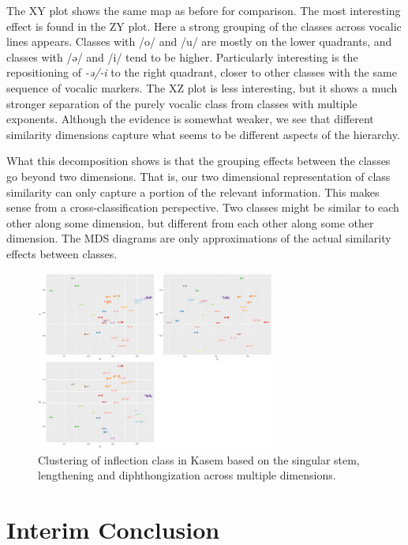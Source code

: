 The XY plot shows the same map as before for comparison. The most interesting effect is found in the ZY plot. Here a strong grouping of the classes across vocalic lines appears. Classes with /o/ and /u/ are mostly on the lower quadrants, and classes with /ə/ and /i/ tend to be higher. Particularly interesting is the repositioning of \textit{-ə/-i} to the right quadrant, closer to other classes with the same sequence of vocalic markers. The XZ plot is less interesting, but it shows a much stronger separation of the purely vocalic class from classes with multiple exponents. Although the evidence is somewhat weaker, we see that different similarity dimensions capture what seems to be different aspects of the hierarchy.

What this decomposition shows is that the grouping effects between the classes go beyond two dimensions. That is, our two dimensional representation of class similarity can only capture a portion of the relevant information. This makes sense from a cross-classification perspective. Two classes might be similar to each other along some dimension, but different from each other along some other dimension. The MDS diagrams are only approximations of the actual similarity effects between classes.

\begin{figure}
  \centering
  \includegraphics[width=0.7\textwidth]{./figures/kasem/kasem-nouns-hclust-sim-multi.pdf}
  \caption{Clustering of inflection class in Kasem based on the singular stem, lengthening and diphthongization across multiple dimensions.}\label{fig:class-cluster-kasem-3}
\end{figure}

\section{Interim Conclusion}

